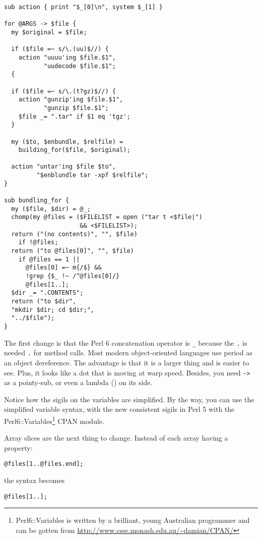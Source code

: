 \documentclass{article}
\newenvironment{example}
  {\addtolength{\linewidth}{-\parindent}%
   \null\begin{minipage}{\linewidth}}
  {\end{minipage}\addtolength{\linewidth}{\parindent}\null}
\begin{document}
\begin{example}
\begin{verbatim}
sub action { print "$_[0]\n", system $_[1] }

for @ARGS -> $file {
  my $original = $file;

  if ($file =~ s/\.(uu)$//) {
    action "uuuu'ing $file.$1",
           "uudecode $file.$1";
  {

  if ($file =~ s/\.(t?gz)$//) {
    action "gunzip'ing $file.$1",
           "gunzip $file.$1";
    $file _= ".tar" if $1 eq 'tgz';
  }

  my ($to, $enbundle, $relfile) = 
    building_for($file, $original);

  action "untar'ing $file $to",
         "$enblundle tar -xpf $relfile";
}

sub bundling_for {
  my ($file, $dir) = @_;
  chomp(my @files = ($FILELIST = open ("tar t <$file|")
                     && <$FILELIST>);
  return ("(no contents)", "", $file)
    if !@files;
  return ("to @files[0]", "", $file)
    if @files == 1 ||
      @files[0] =~ m{/$} &&
	  !grep {$_ !~ /^@files[0]/}
	  @files[1..];
  $dir _= ".CONTENTS";
  return ("to $dir",
  "mkdir $dir; cd $dir;",
  "../$file");
}

\end{verbatim}
\end{example}

The first change is that the Perl 6 concatenation operator is \verb'_'
because the \verb'.' is needed \verb'.' for method calls.  Most modern
object-oriented languages use period as an object dereference.  The
advantage is that it is a larger thing and is easier to see.  Plus, it
looks like a dot that is moving at warp speed.  Besides, you need
\verb'->' as a pointy-sub, or even a lambda ()
on its side.

Notice how the sigils on the variables are simplified.
By the way, you can use the simplified variable syntax, with the new
consistent sigils in Perl 5 with the
Perl6::Variables\footnote{Perl6::Variables is written by a brilliant,
young Australian programmer and can be gotten from
\url{http://www.csse.monash.edu.au/~damian/CPAN/}} CPAN module.

Array slices are the next thing to change. Instead of each array 
having a property:

\verb'@files[1..@files.end];'

the syntax becomes

\verb'@files[1..];'
\end{document}
